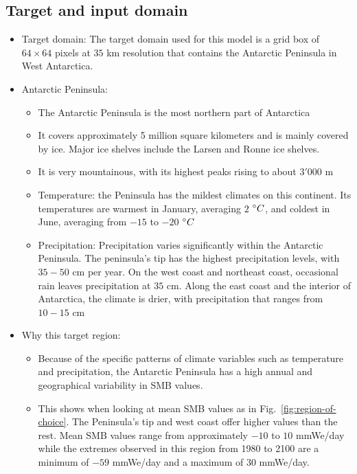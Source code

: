 \documentclass[a4paper,11pt,oneside]{report}
\begin{document}
\subsection{Target and input domain}
\begin{itemize}
   \item Target domain: The target domain used for this model is a grid box of $64 \times 64$ pixels at $35$ \si{km} resolution that contains the Antarctic Peninsula in West Antarctica. 
    \item Antarctic Peninsula: 
    \begin{itemize}
        \item The Antarctic Peninsula is the most northern part of Antarctica
        \item It covers approximately 5 million square kilometers and is mainly covered by ice. Major ice shelves include the Larsen and Ronne ice shelves.
        \item It is very mountainous, with its highest peaks rising to about $3'000$ \si{m}
        \item Temperature: the Peninsula has the mildest climates on this continent. Its temperatures are warmest in January, averaging $2$ $\degree C$, and coldest in June, averaging from $-15$ to $-20$ $\degree C$~\cite{AntarcticPeninsula}
        \item Precipitation: Precipitation varies significantly within the Antarctic Peninsula. The peninsula's tip has the highest precipitation levels, with $35-50$ \si{cm} per year. On the west coast and northeast coast, occasional rain leaves precipitation at $35$ \si{cm}. Along the east coast and the interior of Antarctica, the climate is drier, with precipitation that ranges from $10-15$ \si{cm}~\cite{antarctic-climate, antarctic-climate-2}
    \end{itemize} 
    \item Why this target region: 
    \begin{itemize}
        \item Because of the specific patterns of climate variables such as temperature and precipitation, the Antarctic Peninsula has a high annual and geographical variability in SMB values. 
        \item This shows when looking at mean SMB values as in Fig.~\ref{fig:region-of-choice}. The Peninsula's tip and west coast offer higher values than the rest. Mean SMB values range from approximately $-10$ to $10$ \si{mmWe/day} while the extremes observed in this region from 1980 to 2100 are a minimum of $-59$ \si{mmWe/day} and a maximum of $30$ \si{mmWe/day}. 

\end{itemize}
\end{itemize}
\end{document}
